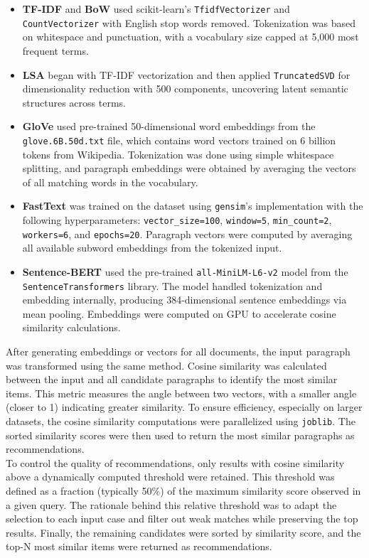 \documentclass[conference]{IEEEtran}
\begin{document}
\begin{itemize}
    \item \textbf{TF-IDF} and \textbf{BoW} used scikit-learn's \texttt{TfidfVectorizer} and \texttt{CountVectorizer} with English stop words removed. Tokenization was based on whitespace and punctuation, with a vocabulary size capped at 5,000 most frequent terms.

    \item \textbf{LSA} began with TF-IDF vectorization and then applied \texttt{TruncatedSVD} for dimensionality reduction with 500 components, uncovering latent semantic structures across terms.

    \item \textbf{GloVe} used pre-trained 50-dimensional word embeddings from the \texttt{glove.6B.50d.txt} file, which contains word vectors trained on 6 billion tokens from Wikipedia. Tokenization was done using simple whitespace splitting, and paragraph embeddings were obtained by averaging the vectors of all matching words in the vocabulary.

    \item \textbf{FastText} was trained on the dataset using \texttt{gensim}'s implementation with the following hyperparameters: \texttt{vector\_size=100}, \texttt{window=5}, \texttt{min\_count=2}, \texttt{workers=6}, and \texttt{epochs=20}. Paragraph vectors were computed by averaging all available subword embeddings from the tokenized input.

    \item \textbf{Sentence-BERT} used the pre-trained \texttt{all-MiniLM-L6-v2} model from the \texttt{SentenceTransformers} library. The model handled tokenization and embedding internally, producing 384-dimensional sentence embeddings via mean pooling. Embeddings were computed on GPU to accelerate cosine similarity calculations.
\end{itemize}
After generating embeddings or vectors for all documents, the input paragraph was transformed using the same method. Cosine similarity was calculated between the input and all candidate paragraphs to identify the most similar items. This metric measures the angle between two vectors, with a smaller angle (closer to 1) indicating greater similarity.
%
To ensure efficiency, especially on larger datasets, the cosine similarity computations were parallelized using \texttt{joblib}. 
The sorted similarity scores were then used to return the most similar paragraphs as recommendations.\\
%
To control the quality of recommendations, only results with cosine similarity above a dynamically computed threshold were retained. This threshold was defined as a fraction (typically 50\%) of the maximum similarity score observed in a given query. The rationale behind this relative threshold was to adapt the selection to each input case and filter out weak matches while preserving the top results. Finally, the remaining candidates were sorted by similarity score, and the top-N most similar items were returned as recommendations.
\end{document}
